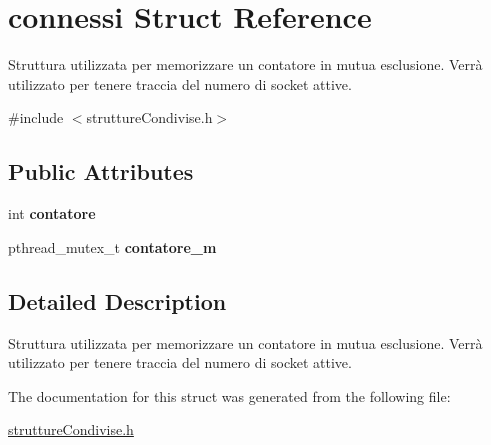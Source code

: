 \hypertarget{structconnessi}{}\section{connessi Struct Reference}
\label{structconnessi}


Struttura utilizzata per memorizzare un contatore in mutua esclusione. Verrà utilizzato per tenere traccia del numero di socket attive.  




{\ttfamily \#include $<$strutture\+Condivise.\+h$>$}

\subsection*{Public Attributes}
\begin{DoxyCompactItemize}
\item 
\mbox{\label{structconnessi_a99b2842bde5fca56a5655eec9adf5098}} 
int {\bfseries contatore}
\item 
\mbox{\label{structconnessi_a7d365577f649a89ed13710c5bf05399f}} 
pthread\+\_\+mutex\+\_\+t {\bfseries contatore\+\_\+m}
\end{DoxyCompactItemize}


\subsection{Detailed Description}
Struttura utilizzata per memorizzare un contatore in mutua esclusione. Verrà utilizzato per tenere traccia del numero di socket attive. 

The documentation for this struct was generated from the following file\+:\begin{DoxyCompactItemize}
\item 
\hyperlink{struttureCondivise_8h}{strutture\+Condivise.\+h}\end{DoxyCompactItemize}
